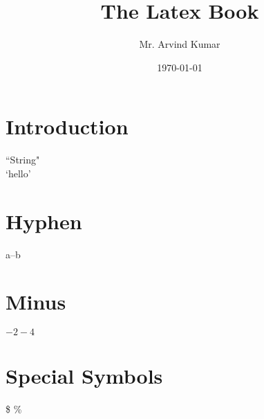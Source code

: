 \documentclass{book}
\begin{document}
	\title{The Latex Book}
	\author{Mr. Arvind Kumar}
	\date{\today}
	\maketitle
	\tableofcontents
	\newpage
	\chapter{Introduction}
	``String"\\
	`hello'
	\chapter{Hyphen}
	a--b
	
	\chapter{Minus}
	$ -2-4 $
	\chapter{Special Symbols}
	\$
	\%
\end{document}
